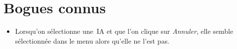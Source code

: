 \section{Bogues connus}
\begin{itemize}

	\item Lorsqu'on sélectionne une~IA et que l'on clique sur \textit{Annuler}, 
            elle semble sélectionnée dans le menu alors qu'elle ne l'est pas.
            
    
\end{itemize}